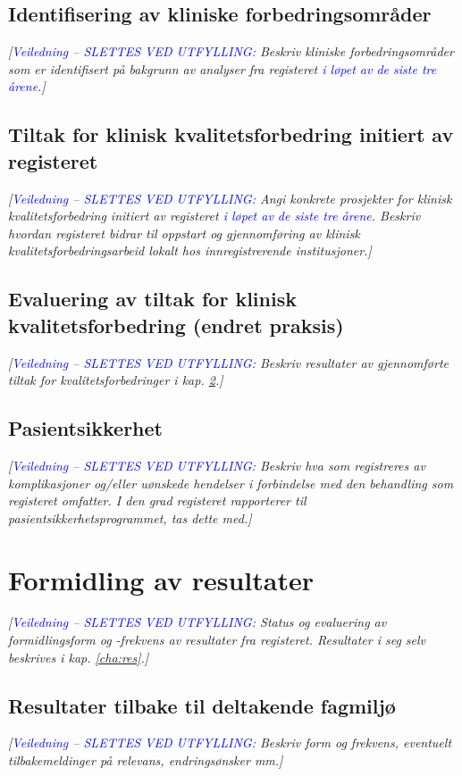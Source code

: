 \documentclass[norsk, a4paper, twocolumn]{report}
\newcommand{\newtext}[1]{\cbstart\textcolor{blue}{#1\cbend}}
\newcommand{\guide}[1] {
	\textit{[\textcolor{guidegray}{\newtext{Veiledning -- SLETTES VED UTFYLLING:} #1}]}
	}
\begin{document}
\section{Identifisering av kliniske forbedringsområder}\label{sec:ide}
\guide{Beskriv kliniske forbedringsområder som er identifisert på bakgrunn
av analyser fra registeret \newtext{i løpet av de siste tre årene}.}

\section{Tiltak for klinisk kvalitetsforbedring initiert av
registeret}\label{sec:brures}
\guide{Angi konkrete prosjekter for klinisk kvalitetsforbedring initiert av
registeret \newtext{i løpet av de siste tre årene}. Beskriv hvordan registeret
bidrar til oppstart og gjennomføring av klinisk kvalitetsforbedringsarbeid
lokalt hos innregistrerende institusjoner.}

\section{Evaluering av tiltak for klinisk kvalitetsforbedring (endret praksis)}\label{sec:evakva}
\guide{Beskriv resultater av gjennomførte tiltak for kvalitetsforbedringer
i kap. \ref{sec:brures}.}

\section{Pasientsikkerhet}\label{sec:kom}
\guide{Beskriv hva som registreres av komplikasjoner og/eller uønskede
hendelser i forbindelse med den behandling som registeret omfatter. I den grad
registeret rapporterer til pasientsikkerhetsprogrammet, tas dette med.}




\chapter{Formidling av resultater}\label{cha:dat}
\guide{Status og evaluering av formidlingsform og -frekvens
av resultater fra registeret. Resultater i seg selv beskrives i kap.
\ref{cha:res}.}

\section{Resultater tilbake til deltakende fagmiljø}\label{sec:resfag}
\guide{Beskriv form og frekvens,  eventuelt tilbakemeldinger på relevans,
endringsønsker mm.}
\end{document}
